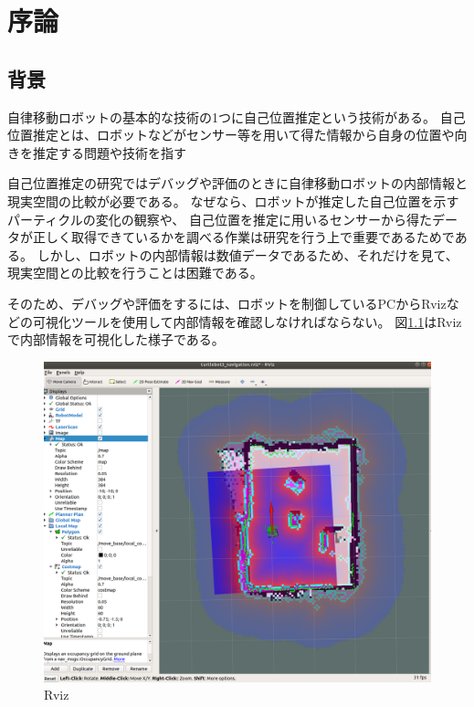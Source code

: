 \chapter{序論}

\section{背景}
自律移動ロボットの基本的な技術の1つに自己位置推定という技術がある。
自己位置推定とは、ロボットなどがセンサー等を用いて得た情報から自身の位置や向きを推定する問題や技術を指す

自己位置推定の研究ではデバッグや評価のときに自律移動ロボットの内部情報と現実空間の比較が必要である。
なぜなら、ロボットが推定した自己位置を示すパーティクルの変化の観察や、
自己位置を推定に用いるセンサーから得たデータが正しく取得できているかを調べる作業は研究を行う上で重要であるためである。
しかし、ロボットの内部情報は数値データであるため、それだけを見て、現実空間との比較を行うことは困難である。


そのため、デバッグや評価をするには、ロボットを制御しているPCからRvizなどの可視化ツールを使用して内部情報を確認しなければならない。
図\ref{Rviz}はRvizで内部情報を可視化した様子である。

\begin{figure}[H]
	\begin{center}
		\includegraphics[width=1.0\linewidth]{figs/Rviz.png}
		\caption{Rviz}
		\label{Rviz}
	\end{center}
\end{figure}

